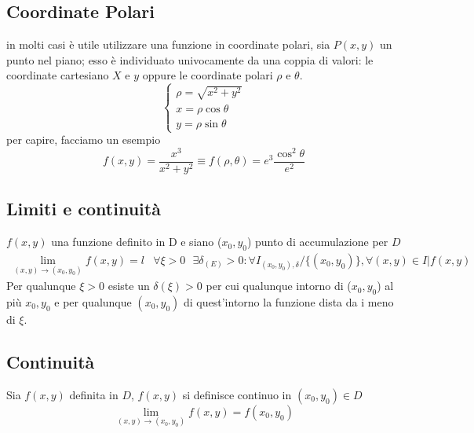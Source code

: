 \subsection{Coordinate Polari}
\begin{defi}
  in molti casi è utile utilizzare una funzione in coordinate polari, sia $P(x,y)$ un punto nel piano; esso
  è individuato univocamente da una coppia di valori: le coordinate cartesiano $X$ e $y$ oppure le coordinate
  polari $\rho$ e $\theta$.
  \begin{equation*}
    \begin{cases}
      \rho =\sqrt{x^2+y^2}\\
      x=\rho\cos\theta\\
      y=\rho\sin\theta
    \end{cases}
  \end{equation*}
  per capire, facciamo un esempio
  \begin{equation}
    f(x,y)=\frac{x^3}{x^2+y^2}\equiv f(\rho,\theta)=e^3\frac{\cos^2\theta}{e^2}
  \end{equation} 
\end{defi}
\subsection{Limiti e continuità}
\begin{defi}
  $f(x,y)$ una funzione definito in D e siano ($x_0,y_0$) punto di accumulazione per $D$
  \begin{equation}
    \begin{matrix}
      \lim\limits_{(x,y)\to(x_0,y_0)} f(x,y) = l & \forall\xi>0\text{ } \exists \delta_{(E)}>0:\forall I_{(x_0,y_0),\delta}
                                            /\{(x_0,y_0)\}, \forall(x,y)\in I | f(x,y)
    \end{matrix}
  \end{equation}
  Per qualunque $\xi > 0$ esiste un $\delta(\xi)>0$ per cui qualunque intorno di ($x_0,y_0$) al più $x_0,y_0$ e
  per qualunque $(x_0,y_0)$ di quest'intorno la funzione dista da i meno di $\xi$.
\end{defi}
\subsection{Continuità}
\begin{defi}
  Sia $f(x,y)$ definita in $D$, $f(x,y)$ si definisce {\color{red} continuo} in $(x_0,y_0)\in D$
  \begin{equation}
    \lim\limits_{(x,y)\to(x_0,y_0)}f(x,y)=f(x_0,y_0)
  \end{equation}
\end{defi}
